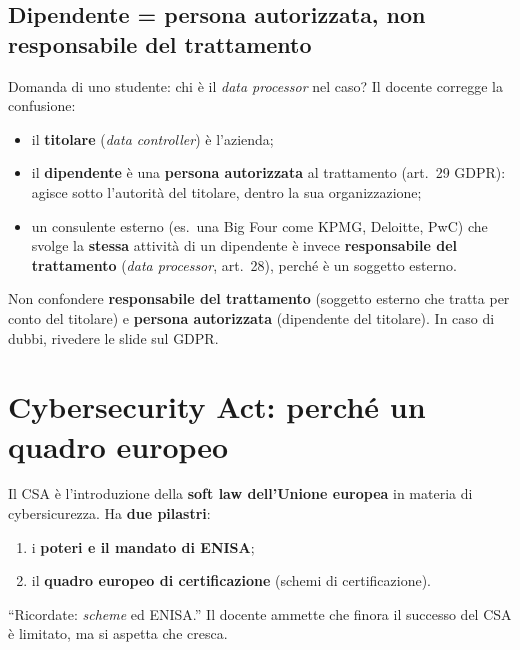 \subsection{Dipendente = persona autorizzata, non responsabile del trattamento}
Domanda di uno studente: chi è il \emph{data processor} nel caso? Il docente corregge la confusione:
\begin{itemize}
  \item il \textbf{titolare} (\emph{data controller}) è l'azienda;
  \item il \textbf{dipendente} è una \textbf{persona autorizzata} al trattamento (art.~29 GDPR): agisce
    sotto l'autorità del titolare, dentro la sua organizzazione;
  \item un consulente esterno (es.\ una Big Four come KPMG, Deloitte, PwC) che svolge la \textbf{stessa}
    attività di un dipendente è invece \textbf{responsabile del trattamento} (\emph{data processor},
    art.~28), perché è un soggetto esterno.
\end{itemize}
\begin{esame}
Non confondere \textbf{responsabile del trattamento} (soggetto esterno che tratta per conto del titolare)
e \textbf{persona autorizzata} (dipendente del titolare). In caso di dubbi, rivedere le slide sul GDPR.
\end{esame}

\section{Cybersecurity Act: perché un quadro europeo}
Il CSA è l'introduzione della \textbf{soft law dell'Unione europea} in materia di cybersicurezza. Ha
\textbf{due pilastri}:
\begin{enumerate}
  \item i \textbf{poteri e il mandato di ENISA};
  \item il \textbf{quadro europeo di certificazione} (schemi di certificazione).
\end{enumerate}
``Ricordate: \emph{scheme} ed ENISA.'' Il docente ammette che finora il successo del CSA è limitato, ma
si aspetta che cresca.

